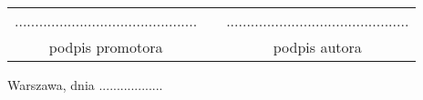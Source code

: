 \documentclass[a4paper,11pt,twoside,openright]{report}
\theoremstyle{definition}
\newcommand{\tytul}{Komputerowe wspomaganie detekcji obszaru kortów badmintona z~wykorzystaniem sieci neuronowych}
\renewcommand{\title}{Detecting badminton courts using computer vision powered \mbox{by neural networks}}
\begin{document}
\sloppy


% 




\thispagestyle{empty}\newpage
\null

\vfill

\begin{center}
\begin{tabular}[t]{ccc}

............................................. & \hspace*{100pt} & .............................................\\
podpis promotora & \hspace*{100pt} & podpis autora


\end{tabular}
\end{center}




{
\begin{abstract}

\begin{center}
\tytul
\end{center}

{streszczenie}

\end{abstract}
}

\null\thispagestyle{empty}\newpage

{
\begin{abstract}

\begin{center}
\title
\end{center}

{abstract}

\end{abstract}
}




\null\thispagestyle{empty}\newpage

\null \hfill Warszawa, dnia ..................\\

\par\vspace{5cm}
\end{document}
